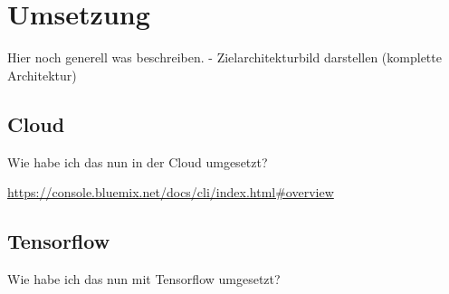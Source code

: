 \section{Umsetzung}
Hier noch generell was beschreiben. - Zielarchitekturbild darstellen (komplette Architektur)

\subsection{Cloud}
Wie habe ich das nun in der Cloud umgesetzt?

\url{https://console.bluemix.net/docs/cli/index.html#overview}

\subsection{Tensorflow}
Wie habe ich das nun mit Tensorflow umgesetzt?